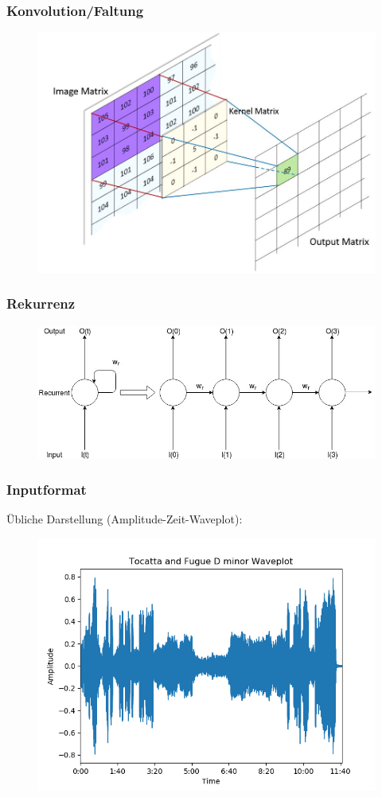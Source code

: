 \documentclass{beamer}
\begin{document}
\frame
{
	\frametitle{Konvolution/Faltung}
	\begin{figure}[h!]
		\centering
		\includegraphics[width=0.7\linewidth,height=0.7\textheight, keepaspectratio]{res/old/conv.JPG}
		\footnotemark
	\end{figure}

}

\frame
{
	\frametitle{Rekurrenz}
	\begin{figure}[h!]
		\centering
		\includegraphics[width=\linewidth,height=\textheight, keepaspectratio]{res/old/recurrence.jpg}
	\end{figure}
}


\frame
{
	\frametitle{Inputformat}
	Übliche Darstellung (Amplitude-Zeit-Waveplot):
	\begin{figure}[h!]
		\centering
		\includegraphics[width=0.8\linewidth,height=0.8\textheight, keepaspectratio]{res/old/tocattaandfuguewaveplot.png}
	\end{figure}
}
\end{document}
